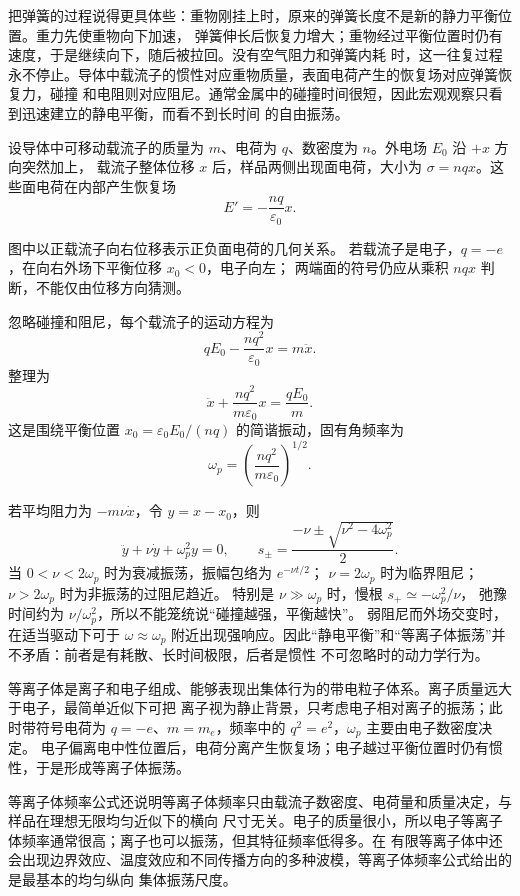 把弹簧的过程说得更具体些：重物刚挂上时，原来的弹簧长度不是新的静力平衡位置。重力先使重物向下加速，
弹簧伸长后恢复力增大；重物经过平衡位置时仍有速度，于是继续向下，随后被拉回。没有空气阻力和弹簧内耗
时，这一往复过程永不停止。导体中载流子的惯性对应重物质量，表面电荷产生的恢复场对应弹簧恢复力，碰撞
和电阻则对应阻尼。通常金属中的碰撞时间很短，因此宏观观察只看到迅速建立的静电平衡，而看不到长时间
的自由振荡。

设导体中可移动载流子的质量为 $m$、电荷为 $q$、数密度为 $n$。外电场 $E_0$ 沿 $+x$ 方向突然加上，
载流子整体位移 $x$ 后，样品两侧出现面电荷，大小为 $\sigma=nqx$。这些面电荷在内部产生恢复场
\[
  E'=-\frac{nq}{\varepsilon_0}x.
\]

图中以正载流子向右位移表示正负面电荷的几何关系。
若载流子是电子，$q=-e$，在向右外场下平衡位移 $x_0<0$，电子向左；
两端面的符号仍应从乘积 $nqx$ 判断，不能仅由位移方向猜测。
\plasmaSlabFigure

忽略碰撞和阻尼，每个载流子的运动方程为
\[
  qE_0-\frac{nq^2}{\varepsilon_0}x=m\ddot x.
\]
整理为
\begin{equation}
  \boxed{\ddot x+\frac{nq^2}{m\varepsilon_0}x=\frac{qE_0}{m}}.
\end{equation}
这是围绕平衡位置 $x_0=\varepsilon_0E_0/(nq)$ 的简谐振动，固有角频率为
\begin{equation}
  \boxed{\omega_p=\left(\frac{nq^2}{m\varepsilon_0}\right)^{1/2}}.
\end{equation}

若平均阻力为 $-m\nu\dot x$，令 $y=x-x_0$，则
\[
 \ddot y+\nu\dot y+\omega_p^2y=0,\qquad
 s_\pm=\frac{-\nu\pm\sqrt{\nu^2-4\omega_p^2}}2.
\]
当 $0<\nu<2\omega_p$ 时为衰减振荡，振幅包络为 $e^{-\nu t/2}$；
$\nu=2\omega_p$ 时为临界阻尼；$\nu>2\omega_p$ 时为非振荡的过阻尼趋近。
特别是 $\nu\gg\omega_p$ 时，慢根 $s_+\simeq-\omega_p^2/\nu$，
弛豫时间约为 $\nu/\omega_p^2$，所以不能笼统说“碰撞越强，平衡越快”。
弱阻尼而外场交变时，在适当驱动下可于 $\omega\approx\omega_p$ 附近出现强响应。因此“静电平衡”和“等离子体振荡”并不矛盾：前者是有耗散、长时间极限，后者是惯性
不可忽略时的动力学行为。

等离子体是离子和电子组成、能够表现出集体行为的带电粒子体系。离子质量远大于电子，最简单近似下可把
离子视为静止背景，只考虑电子相对离子的振荡；此时带符号电荷为 $q=-e$、$m=m_e$，频率中的 $q^2=e^2$，$\omega_p$ 主要由电子数密度决定。
电子偏离电中性位置后，电荷分离产生恢复场；电子越过平衡位置时仍有惯性，于是形成等离子体振荡。

等离子体频率公式还说明等离子体频率只由载流子数密度、电荷量和质量决定，与样品在理想无限均匀近似下的横向
尺寸无关。电子的质量很小，所以电子等离子体频率通常很高；离子也可以振荡，但其特征频率低得多。在
有限等离子体中还会出现边界效应、温度效应和不同传播方向的多种波模，等离子体频率公式给出的是最基本的均匀纵向
集体振荡尺度。

